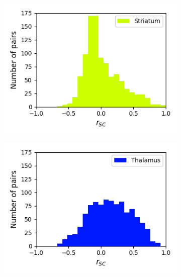 \documentclass[a4paper,12pt]{article}
\theoremstyle{definition}
\begin{document}
\begin{figure}[p]
\begin{subfigure}{0.5\textwidth}
    \includegraphics[width=\textwidth]{figures/all_striatum_8_1p0_correlation_histogram.png}
  \end{subfigure}
  \begin{subfigure}{0.5\textwidth}
    \centering
    \includegraphics[width=\textwidth]{figures/all_thalamus_8_1p0_correlation_histogram.png}
  \end{subfigure}
  \begin{subfigure}{0.5\textwidth}
    \centering

\end{subfigure}
\end{figure}
\end{document}
